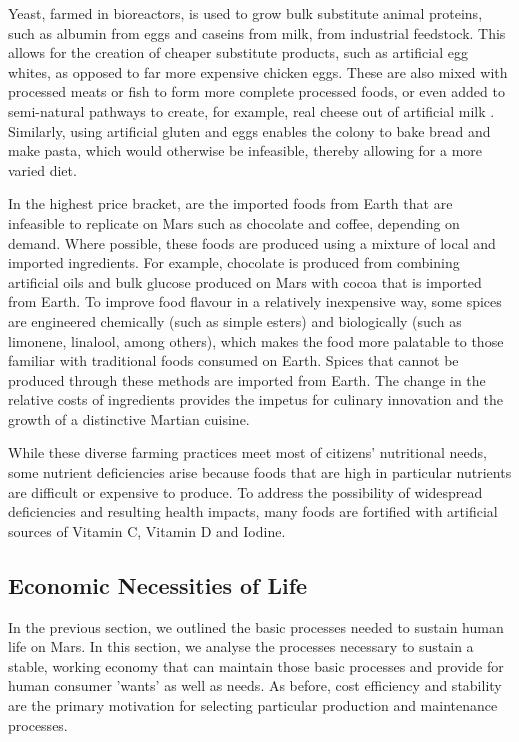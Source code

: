 \documentclass[fleqn,10pt]{Stylesheet} %
\begin{document}
Yeast, farmed in bioreactors, is used to grow bulk substitute animal proteins, such as albumin from eggs and caseins from milk, from industrial feedstock. This allows for the creation of cheaper substitute products, such as artificial egg whites, as opposed to far more expensive chicken eggs. These are also mixed with processed meats or fish to form more complete processed foods, or even added to semi-natural pathways to create, for example, real cheese out of artificial milk \cite{Pandya2017}. Similarly, using artificial gluten and eggs enables the colony to bake bread and make pasta, which would otherwise be infeasible, thereby allowing for a more varied diet.

In the highest price bracket, are the imported foods from Earth that are infeasible to replicate on Mars such as chocolate and coffee, depending on demand. Where possible, these foods are produced using a mixture of local and imported ingredients. For example, chocolate is produced from combining artificial oils and bulk glucose produced on Mars with cocoa that is imported from Earth. To improve food flavour in a relatively inexpensive way, some spices are engineered chemically (such as simple esters) and biologically (such as limonene, linalool, among others), which makes the food more palatable to those familiar with traditional foods consumed on Earth. Spices that cannot be produced through these methods are imported from Earth. The change in the relative costs of ingredients provides the impetus for culinary innovation and the growth of a distinctive Martian cuisine.

While these diverse farming practices meet most of citizens' nutritional needs, some nutrient deficiencies arise because foods that are high in particular nutrients are difficult or expensive to produce. To address the possibility of widespread deficiencies and resulting health impacts, many foods are fortified with artificial sources of Vitamin C, Vitamin D and Iodine.

\subsection{Economic Necessities of Life}

In the previous section, we outlined the basic processes needed to sustain human life on Mars. In this section, we analyse the processes necessary to sustain a stable, working economy that can maintain those basic processes and provide for human consumer 'wants' as well as needs. As before, cost efficiency and stability are the primary motivation for selecting particular production and maintenance processes. 
\end{document}
